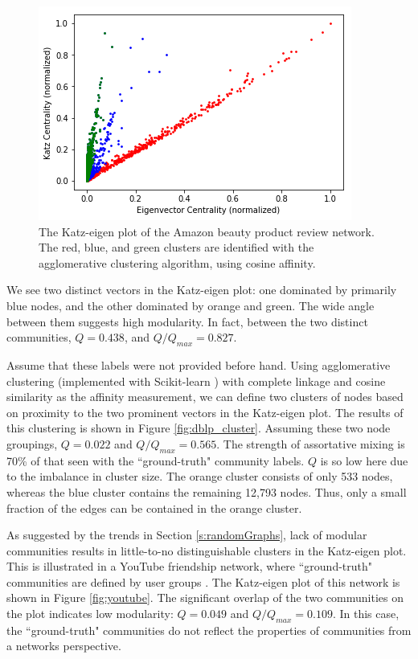 \documentclass{IEEEtran}
\begin{document}
	\begin{figure}
		\centering
		\includegraphics[width=0.98\linewidth]{amazon_beauty_clustered.png}
		\caption{The Katz-eigen plot of the Amazon beauty product review network. The red, blue, and green clusters are identified with the agglomerative clustering algorithm, using cosine affinity.}
		\label{fig:amazon_beauty}
	\end{figure}
	
	We see two distinct vectors in the Katz-eigen plot: one dominated by primarily blue nodes, and the other dominated by orange and green. The wide angle between them suggests high modularity. In fact, between the two distinct communities, $Q=0.438$, and $Q/Q_{max} = 0.827$.
	
	Assume that these labels were not provided before hand. Using agglomerative clustering (implemented with Scikit-learn \cite{scikit-learn}) with complete linkage and cosine similarity as the affinity measurement, we can define two clusters of nodes based on proximity to the two prominent vectors in the Katz-eigen plot. The results of this clustering is shown in Figure \ref{fig:dblp_cluster}. Assuming these two node groupings, $Q=0.022$ and $Q/Q_{max}=0.565$. The strength of assortative mixing is 70\% of that seen with the ``ground-truth" community labels. $Q$ is so low here due to the imbalance in cluster size. The orange cluster consists of only 533 nodes, whereas the blue cluster contains the remaining 12,793 nodes. Thus, only a small fraction of the edges can be contained in the orange cluster.
	
	As suggested by the trends in Section \ref{s:randomGraphs}, lack of modular communities results in little-to-no distinguishable clusters in the Katz-eigen plot. This is illustrated in a YouTube friendship network, where ``ground-truth" communities are defined by user groups \cite{DBLP,youtube}. The Katz-eigen plot of this network is shown in Figure \ref{fig:youtube}. The significant overlap of the two communities on the plot indicates low modularity: $Q=0.049$ and $Q/Q_{max}=0.109$. In this case, the ``ground-truth" communities do not reflect the properties of communities from a networks perspective.
	
\end{document}
